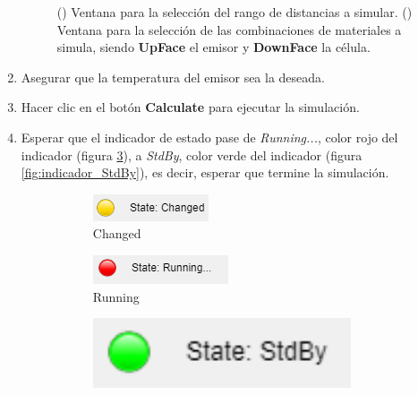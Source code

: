 \begin{enumerate}
\begin{figure}[H]
\begin{subfigure}[b]{0.48\textwidth}
	\end{subfigure}
	\caption{() Ventana para la selección del rango de distancias a simular. () Ventana para la selección de las combinaciones de materiales a simula, siendo \textbf{UpFace} el emisor y \textbf{DownFace} la célula.}%
	\label{fig:sets}%
	\end{figure}
	\item Asegurar que la temperatura del emisor sea la deseada.
	\item Hacer clic en el botón \textbf{Calculate} para ejecutar la simulación.
	\item Esperar que el indicador de estado pase de \textit{Running...}, color rojo del indicador (figura \ref{fig:indicador_Running}), a \textit{StdBy}, color verde del indicador (figura \ref{fig:indicador_StdBy}), es decir, esperar que termine la simulación.
	\begin{figure}[H]
	\centering
	\begin{subfigure}[b]{0.3\textwidth}
	\centering
	\includegraphics[width=\textwidth]{figuras/Procedimiento_Simulaciones/Radiacion/estado_changed}%
	\caption{Changed}%
	\label{fig:indicador_Changed}%
	\end{subfigure}
	\hfill
	\begin{subfigure}[b]{0.3\textwidth}
	\centering
	\includegraphics[width=\textwidth]{figuras/Procedimiento_Simulaciones/Radiacion/estado_running}%
	\caption{Running}%
	\label{fig:indicador_Running}%
	\end{subfigure}
	\hfill
	\begin{subfigure}[b]{0.3\textwidth}
	\centering
	\includegraphics[width=0.9\textwidth]{figuras/Procedimiento_Simulaciones/Radiacion/estado_stdby}%

\end{subfigure}
\end{figure}
\end{enumerate}
